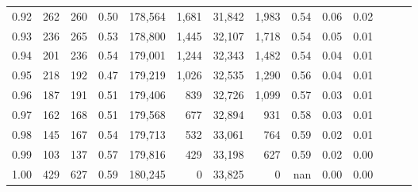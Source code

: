 \begin{tabular}{rrrrrrrrrrrrrr}
0.92 &    262 &  260 &  0.50 &  178,564 &    1,681 &  31,842 &   1,983 &  0.54 &  0.06 &      0.02 \\
0.93 &    236 &  265 &  0.53 &  178,800 &    1,445 &  32,107 &   1,718 &  0.54 &  0.05 &      0.01 \\
0.94 &    201 &  236 &  0.54 &  179,001 &    1,244 &  32,343 &   1,482 &  0.54 &  0.04 &      0.01 \\
0.95 &    218 &  192 &  0.47 &  179,219 &    1,026 &  32,535 &   1,290 &  0.56 &  0.04 &      0.01 \\
0.96 &    187 &  191 &  0.51 &  179,406 &      839 &  32,726 &   1,099 &  0.57 &  0.03 &      0.01 \\
0.97 &    162 &  168 &  0.51 &  179,568 &      677 &  32,894 &     931 &  0.58 &  0.03 &      0.01 \\
0.98 &    145 &  167 &  0.54 &  179,713 &      532 &  33,061 &     764 &  0.59 &  0.02 &      0.01 \\
0.99 &    103 &  137 &  0.57 &  179,816 &      429 &  33,198 &     627 &  0.59 &  0.02 &      0.00 \\
1.00 &    429 &  627 &  0.59 &  180,245 &        0 &  33,825 &       0 &   nan &  0.00 &      0.00 \\
\bottomrule
\end{tabular}
